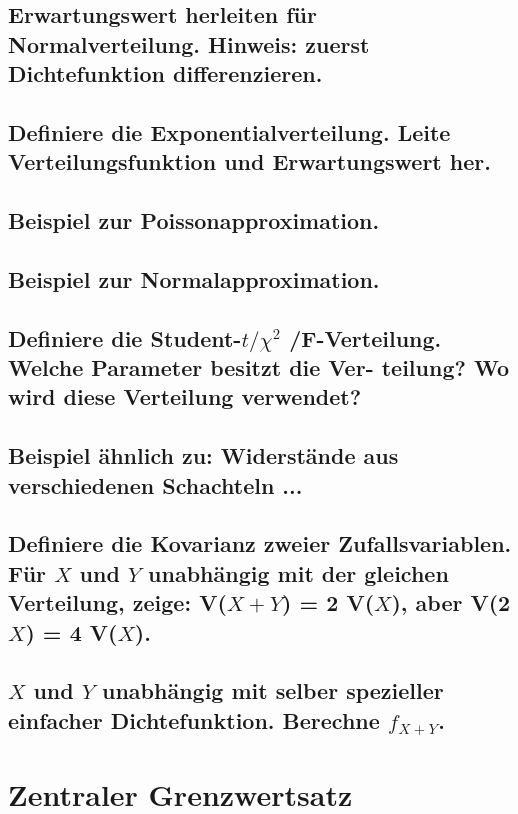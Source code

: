 \documentclass[a4paper,10pt]{article}
\begin{document}
\subsection{Erwartungswert herleiten für Normalverteilung. Hinweis: zuerst Dichtefunktion differenzieren.}

\subsection{Definiere die Exponentialverteilung. Leite Verteilungsfunktion und Erwartungswert her.}

\subsection{Beispiel zur Poissonapproximation.}

\subsection{Beispiel zur Normalapproximation.}

\subsection{Definiere die Student-$t /\chi^2$ /F-Verteilung. Welche Parameter besitzt die Ver-
teilung? Wo wird diese Verteilung verwendet?}

\subsection{Beispiel ähnlich zu: Widerstände aus verschiedenen Schachteln ...}

\subsection{Definiere die Ko\-varianz zweier Zufalls\-variablen.  Für $X$ und $Y$ un\-abhängig mit der gleichen Ver\-teilung, zeige: V($X + Y$) = 2 V($X$), aber V(2$X$) = 4 V($X$).}

\subsection{$X$ und $Y$ unabhängig mit selber spezieller einfacher Dichtefunktion. Berechne $f_{X + Y}$.}

\newpage
\section{Zentraler Grenzwertsatz}
\end{document}
